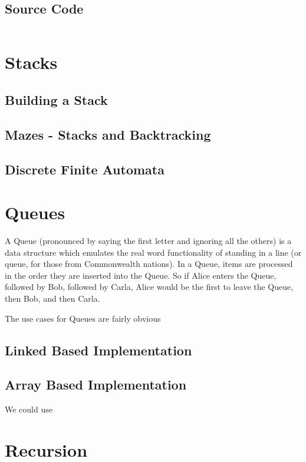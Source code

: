 \documentclass[10pt,a4paper]{book}
\begin{document}
\section{Source Code}
\inputminted{python3}{code/linkedlist.py}


\chapter{Stacks}

\section{Building a Stack}

\section{Mazes - Stacks and Backtracking}



\section{Discrete Finite Automata}

\chapter{Queues}

A Queue (pronounced by saying the first letter and ignoring all the others) is a data structure which emulates the real word functionality of standing in a line (or queue, for those from Commonwealth nations).  
In a Queue, items are processed in the order they are inserted into the Queue.  So if Alice enters the Queue, followed by Bob, followed by Carla, Alice would be the first to leave the Queue, then Bob, and then Carla.

The use cases for Queues are fairly obvious

\section{Linked Based Implementation} 
\section{Array Based Implementation}
We could use 


\chapter{Recursion}
\end{document}
